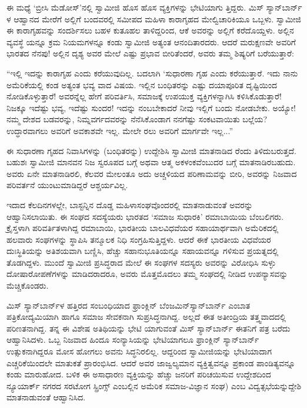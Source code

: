 ಈ ಮಧ್ಯೆ ‘ಬ್ರೀಸಿ ಮೆಡೋಸ್​’ನಲ್ಲಿ ಸ್ವಾಮೀಜಿ ಹೊಸ ಹೊಸ ವ್ಯಕ್ತಿಗಳನ್ನು ಭೇಟಿಯಾಗು ತ್ತಿದ್ದರು. ಮಿಸ್ ಸ್ಯಾನ್​ಬಾರ್ನ್​ಳ ಆಹ್ವಾನದ ಮೇರೆಗೆ ಅಲ್ಲಿಗೆ ಬಂದವರಲ್ಲಿ ಸಮೀಪದ ಮಹಿಳಾ ಕಾರಾಗೃಹದ ಮೇಲ್ವಿಚಾರಿಕಿಯೂ ಒಬ್ಬಳು. ಸ್ವಾಮೀಜಿ ಈ ಕಾರಾಗೃಹವನ್ನು ಸಂದರ್ಶಿಸಲು ಬಹಳ ಕುತೂಹಲ ತಾಳಿದ್ದರಿಂದ, ಆಕೆ ಅವರನ್ನು ಅಲ್ಲಿಗೆ ಕರೆದೊಯ್ದಳು. ಅಲ್ಲಿನ ವ್ಯವಸ್ಥೆ ಯನ್ನೂ ಕ್ರಮ ನಿಯಮಗಳನ್ನೂ ಕಂಡು ಸ್ವಾಮೀಜಿ ಅತ್ಯಂತ ಆನಂದಿತಾರದರು. ಆದರೆ ಮರುಕ್ಷಣವೇ ಅವರಿಗೆ ಭಾರತದ ನೆನಪು! ಅಲ್ಲಿನ ದೃಶ್ಯ ಅವರ ಮೇಲೆ ಎಷ್ಟು ಪ್ರಭಾವ ಬೀರಿತೆಂದರೆ, ಅವರು ತಮ್ಮ ಶಿಷ್ಯರಿಗೆ ಬರೆಯುತ್ತಾರೆ:

“ಇಲ್ಲಿ ಇದನ್ನು ಕಾರಾಗೃಹ ಎಂದು ಕರೆಯುವುದಿಲ್ಲ. ಬದಲಾಗಿ ‘ಸುಧಾರಣಾ ಗೃಹ ಎಂದು ಕರೆಯುತ್ತಾರೆ. ಇದು ನಾನು ಅಮೆರಿಕೆಯಲ್ಲಿ ಕಂಡ ಅತ್ಯಂತ ಭವ್ಯ ವಾದ ವಿಷಯ. ಇಲ್ಲಿನ ಬಂಧಿತರನ್ನು ಎಷ್ಟು ದಯಾಪೂರಿತ ದೃಷ್ಟಿಯಿಂದ ನೋಡಿಕೊಳ್ಳುತ್ತಾರೆ! ಅವರನ್ನೆಲ್ಲ ಹೇಗೆ ಪರಿವರ್ತಿಸಿ, ಸಮಾಜಕ್ಕೆ ಉಪಯುಕ್ತ ವ್ಯಕ್ತಿಗಳನ್ನಾಗಿಸಿ ಕಳಿಸಿಕೊಡುತ್ತಾರೆ! ನಿಜಕ್ಕೂ ಇದೆಷ್ಟು ಭವ್ಯ, ಇದೆಷ್ಟು ಸುಂದರ! ಇದನ್ನು ನಂಬಬೇಕಾದರೆ ನೀವು ಇಲ್ಲಿಗೆ ಬಂದು ನೋಡಬೇಕು. ಅಯ್ಯೋ! ನಮ್ಮ ದೇಶದ ಬಡವರನ್ನು, ನಿಮ್ನವರ್ಗದವರನ್ನು ನೆನೆಸಿಕೊಂಡಾಗ ನನಗೆಷ್ಟು ಸಂಕಟವಾಯಿತು ಬಲ್ಲೆಯ? ಉದ್ಧಾರವಾಗಲು ಅವರಿಗೆ ಅವಕಾಶವೇ ಇಲ್ಲ. ಮೇಲೇ ರಲು ಅವರಿಗೆ ಮಾರ್ಗವೇ ಇಲ್ಲ...”

ಈ ಸುಧಾರಣಾ ಗೃಹದ ನಿವಾಸಿಗಳನ್ನು (ಬಂಧಿತರನ್ನು) ಉದ್ದೇಶಿಸಿ ಸ್ವಾಮೀಜಿ ಮಾತನಾಡಿದ ರೆಂದು ತಿಳಿದುಬರುತ್ತದೆ. ಬಹುಶಃ ಸ್ವಾಮೀಜಿ ಮಾನವನ ನಿಜ ಸ್ವರೂಪದ ಬಗ್ಗೆ ಅಥವಾ ಆತ್ಮ ಅಕಳಂಕವೆಂಬುದರ ಬಗ್ಗೆ ಮಾತನಾಡಿರಬಹುದು. ಅವರು ಏನೇ ಮಾತನಾಡಿರಲಿ, ಕೆಲವರ ಮೇಲಂತೂ ಅದು ಅಚ್ಚಳಿಯದ ಪರಿಣಾಮವನ್ನು ಬೀರಿ, ಅವರನ್ನು ನಿಜವಾದ ಪರಿವರ್ತನೆ ಯುಂಟುಮಾಡಿದ್ದರೆ ಆಶ್ಚರ್ಯವಿಲ್ಲ.

ಇದಾದ ಕೆಲದಿನಗಳಲ್ಲೇ, ಬಾಸ್ಟನ್ನಿನ ದೊಡ್ಡ ಮಹಿಳಾಸಂಘವೊಂದರಲ್ಲಿ ಮಾತನಾಡುವಂತೆ ಅವರನ್ನು ಆಹ್ವಾನಿಸಲಾಯಿತು. ಈ ಸಂಘದ ಸದಸ್ಯೆಯರು ಭಾರತದ ‘ಸಮಾಜ ಸುಧಾರಕಿ’ ರಮಾಬಾಯಿಯ ಬೆಂಬಲಿಗರು. ಕ್ರೈಸ್ತಳಾಗಿ ಪರಿವರ್ತಿತಳಾಗಿದ್ದ ರಮಾಬಾಯಿ, ಭಾರತೀಯ ಬಾಲವಿಧವೆಯರ ಸಹಾಯಾರ್ಥವಾಗಿ ಅಮೆರಿಕದಲ್ಲಿ ಹಲವಾರು ಸಂಘಗಳನ್ನು ಸ್ಥಾಪಿಸಿ ತನ್ಮೂಲಕ ನಿಧಿ ಸಂಗ್ರಹಿಸುತ್ತಿದ್ದಳು. ಆದರೆ ಈಕೆ ಭಾರತೀಯ ವಿಧವೆಯರ ದುಃಸ್ಥಿತಿಯನ್ನು ಅತಿಶಯವಾಗಿ ಬಣ್ಣಿಸಿ, ಹೆಚ್ಚು ಸಹಾನುಭೂತಿಯನ್ನೂ ಸಹಾಯವನ್ನೂ ಗಳಿಸುವ ಪ್ರಯತ್ನದಲ್ಲಿ ತೊಡಗಿದ್ದಳು. ಮುಂದೆ ಸ್ವಾಮೀಜಿ ಪ್ರಸಿದ್ಧರಾದ ಮೇಲೆ ಈ ಸಂಘಗಳ ಸದಸ್ಯರು ಅವರನ್ನು ವಿರೋಧಿಸಿ ಸುಳ್ಳು ದೋಷಾರೋಪಣೆಗಳನ್ನು ಮಾಡಿದರಾದರೂ, ಅವರು ಮೊತ್ತಮೊದಲು ತಮ್ಮ ಸಂಘದಲ್ಲಿ ನೀಡಿದ ಉಪನ್ಯಾಸವನ್ನು ಮೆಚ್ಚಿಕೊಂಡರು.

ಮಿಸ್ ಸ್ಯಾನ್​ಬಾರ್ನ್​ಳ ಹತ್ತಿರದ ಸಂಬಂಧಿಯಾದ ಫ್ರಾಂಕ್ಲಿನ್ ಬೆಂಜಮಿನ್​ಸ್ಯಾನ್​ಬಾರ್ನ್ ಎಂಬಾತ ಪತ್ರಿಕೋದ್ಯಮಿಯಾಗಿ ಹಾಗೂ ಸಮಾಜ ಸೇವಕನಾಗಿ ಸುಪ್ರಸಿದ್ಧನಾಗಿದ್ದ. ಅಲ್ಲದೆ ಈತ ಅತೀಂದ್ರಿಯ ತತ್ತ್ವವಾದದಲ್ಲಿ ಪರಿಣತನಾಗಿದ್ದ. ತನ್ನ ಈ ವಿಶೇಷ ಅತಿಥಿಯನ್ನು ಭೇಟಿ ಯಾಗುವಂತೆ ಮಿಸ್ ಸ್ಯಾನ್​ಬಾರ್ನ್ ಈತನಿಗೆ ಪತ್ರ ಬರೆದು ಆಹ್ವಾನಿಸಿದಳು. ಒಬ್ಬ ನಿಜವಾದ ಹಿಂದೂ ಸಂನ್ಯಾಸಿಯನ್ನು ಭೇಟಿಯಾಗಲೂ ಫ್ರಾಂಕ್ಲಿನ್ ಸ್ಯಾನ್​ಬಾರ್ನ್ ಉತ್ಸುಕನಾಗಿದ್ದರೂ ಮೋಸ ಹೋಗಲು ಅವನು ಸಿದ್ಧನಿರಲಿಲ್ಲ. ಆದ್ದರಿಂದ ಸ್ವಾಮೀಜಿಯನ್ನು ಭೇಟಿಯಾದಾಗ ಎಚ್ಚರಿಕೆಯಿಂದಲೇ ಮಾತುಕತೆ ಪ್ರಾರಂಭಿಸಿದ. ಆದರೆ ಅವರ ಜಾಜ್ವಲ್ಯಮಾನ ವ್ಯಕ್ತಿತ್ವವನ್ನೂ ಪ್ರಕಾಂಡ ಪಾಂಡಿತ್ಯವನ್ನೂ ಕಂಡು ಮಾರುಹೋದ. ಬಳಿಕ ಈ ಅಸಾಧಾರಣ ವ್ಯಕ್ತಿಯನ್ನು ಹೆಚ್ಚು ಜನರಿಗೆ ಪರಿಚಯಿಸುವ ಉದ್ದೇಶದಿಂದ ನ್ಯೂಯಾರ್ಕ್ ನಗರದ ಸರಟೋಗ ಸ್ಪ್ರಿಂಗ್ಸ್ ಎಂಬಲ್ಲಿನ ಅಮೆರಿಕ ಸಮಾಜ-ವಿಜ್ಞಾನ ಸಂಘ) ಎಂಬ ವಿದ್ವತ್ಸಭೆಯನ್ನುದ್ದೇಶಿ ಮಾತನಾಡುವಂತೆ ಆಹ್ವಾನಿಸಿದ.


